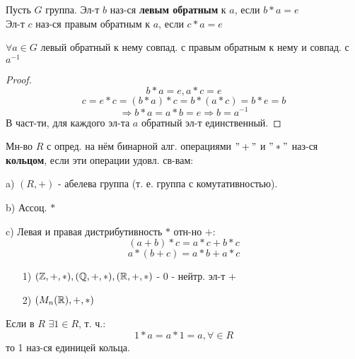 \begin{definition}
Пусть $G$ группа. Эл-т $b$ наз-ся \textbf{левым обратным} к $a$, если $b * a = e$ \\

Эл-т $c$ наз-ся правым обратным к $a$, если $c * a = e$
\end{definition}
\begin{statement}
$\forall a \in G$ левый обратный к нему совпад. с правым обратным к нему и совпад. с $a^{-1}$
\end{statement}
\begin{proof}
  \[
  b * a = e, a * c = e
  \]
\[
  c = e * c = (b * a) * c = b * (a * c) = b * e = b
\]
\[
  \Rightarrow b * a = a * b = e \Rightarrow b = a^{-1}
\]
В част-ти, для каждого эл-та $a$ обратный эл-т единственный.
\end{proof}
\begin{definition}
Мн-во $R$ с опред. на нём бинарной алг. операциями $"+"$ и $"*"$ наз-ся \textbf{кольцом}, если эти операции удовл. св-вам:
\item [a) ] $(R, +)$ - абелева группа (т. е. группа с комутативностью).
\item [b) ] Ассоц. $*$
\item [c) ] Левая и правая дистрибутивность $*$ отн-но $+$:
  \[
    (a + b) * c = a * c + b * c
  \]
  \[
    a * (b + c) = a * b + a * c
  \]
\end{definition}
\begin{example}
\begin{itemize}
  \item [1) ] $(\mathbb{Z}, +, *), (\mathbb{Q}, +, *), (\mathbb{R}, +, *)$ - 0 - нейтр. эл-т $+$
  \item [2) ] $(M_n(\mathbb{R}), +, *)$
\end{itemize}
\end{example}
\begin{definition}
Если в $R$ $\exists 1 \in R$, т. ч.:
\[
1 * a = a * 1 = a, \forall \in R
\]
то 1 наз-ся единицей кольца.
\end{definition}
